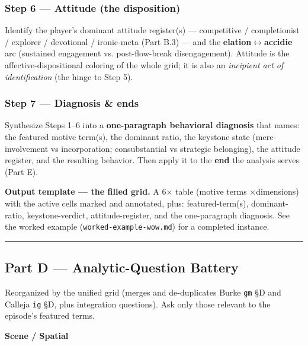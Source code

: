 \documentclass[11pt]{report}
\begin{document}
\subsubsection{Step 6 — Attitude (the disposition)}

Identify the player's dominant attitude register(s) — competitive / completionist / explorer / devotional / ironic-meta (Part B.3) — and the \textbf{elation$\leftrightarrow$\allowbreak accidie} arc (sustained engagement vs. post-flow-break disengagement). Attitude is the affective-dispositional coloring of the whole grid; it is also an \textit{incipient act of identification} (the hinge to Step 5).


\subsubsection{Step 7 — Diagnosis \& ends}

Synthesize Steps 1–6 into a \textbf{one-paragraph behavioral diagnosis} that names: the featured motive term(s), the dominant ratio, the keystone state (mere-involvement vs incorporation; consubstantial vs strategic belonging), the attitude register, and the resulting behavior. Then apply it to the \textbf{end} the analysis serves (Part E).


\begin{diabox}
\textbf{Output template — the filled grid.} A 6$\times$ table (motive terms $\times$\allowbreak  dimensions) with the active cells marked and annotated, plus: featured-term(s), dominant-ratio, keystone-verdict, attitude-register, and the one-paragraph diagnosis. See the worked example (\texttt{worked-\discretionary{}{}{}example-\discretionary{}{}{}wow.\discretionary{}{}{}md}) for a completed instance.

\end{diabox}


\vspace{0.4em}\hrule\vspace{0.8em}


\subsection{Part D — Analytic-Question Battery}


Reorganized by the unified grid (merges and de-duplicates Burke \texttt{gm} §D and Calleja \texttt{ig} §D, plus integration questions). Ask only those relevant to the episode's featured terms.


\textbf{Scene / Spatial}
\end{document}
